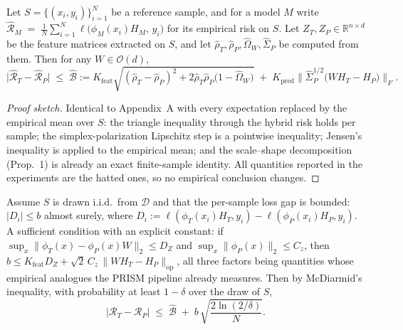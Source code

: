 
\begin{theorem}
\label{thm:empirical}
Let $S=\{(x_i,y_i)\}_{i=1}^{N}$ be a reference sample, and for a model $M$
write $\widehat{\mathcal{R}}_M \;=\; \tfrac1N\sum_{i=1}^{N}
\ell\!\bigl(\phi_M(x_i)H_M,\,y_i\bigr)$ for its empirical risk on $S$.
Let $Z_T,Z_P\in\mathbb{R}^{n\times d}$ be the feature matrices extracted on
$S$, and let $\widehat\rho_T,\widehat\rho_P,\widehat\Omega_W,
\widehat\Sigma_P$ be computed from them. Then for any $W\in\mathcal{O}(d)$,
\begin{equation}
\bigl|\widehat{\mathcal{R}}_T-\widehat{\mathcal{R}}_P\bigr|
\;\le\;
\widehat{\mathcal{B}}
:=
K_{\mathrm{feat}}
\sqrt{(\widehat\rho_T-\widehat\rho_P)^2
      + 2\widehat\rho_T\widehat\rho_P\bigl(1-\widehat\Omega_W\bigr)}
\;+\;
K_{\mathrm{pred}}
\bigl\|\widehat\Sigma_P^{1/2}\bigl(WH_T-H_P\bigr)\bigr\|_F .
\end{equation}
\end{theorem}

\begin{proof}[Proof sketch]
Identical to Appendix~A with every expectation replaced by the empirical
mean over $S$: the triangle inequality through the hybrid risk holds
per sample; the simplex-polarization Lipschitz step is a pointwise
inequality; Jensen's inequality is applied to the empirical mean; and the
scale--shape decomposition (Prop.~1) is already an exact finite-sample
identity. All quantities reported in the experiments are the hatted ones,
so no empirical conclusion changes.
\end{proof}

\begin{corollary}
\label{cor:population}
Assume $S$ is drawn i.i.d.\ from $\mathcal{D}$ and that the per-sample loss
gap is bounded: $|D_i|\le b$ almost surely, where
$D_i:=\ell(\phi_T(x_i)H_T,y_i)-\ell(\phi_P(x_i)H_P,y_i)$.
A sufficient condition with an explicit constant: if
$\sup_x\|\phi_T(x)-\phi_P(x)W\|_2\le D_Z$ and
$\sup_x\|\phi_P(x)\|_2\le C_z$, then
$b \le K_{\mathrm{feat}} D_Z
     + \sqrt{2}\, C_z \,\|WH_T-H_P\|_{\mathrm{op}}$,
all three factors being quantities whose empirical analogues the PRISM pipeline
already measures.
Then by McDiarmid's inequality, with probability at least $1-\delta$ over
the draw of $S$,
\begin{equation}
\bigl|\mathcal{R}_T-\mathcal{R}_P\bigr|
\;\le\;
\widehat{\mathcal{B}}
\;+\;
b\,\sqrt{\frac{2\ln(2/\delta)}{N}} .
\end{equation}
\end{corollary}


